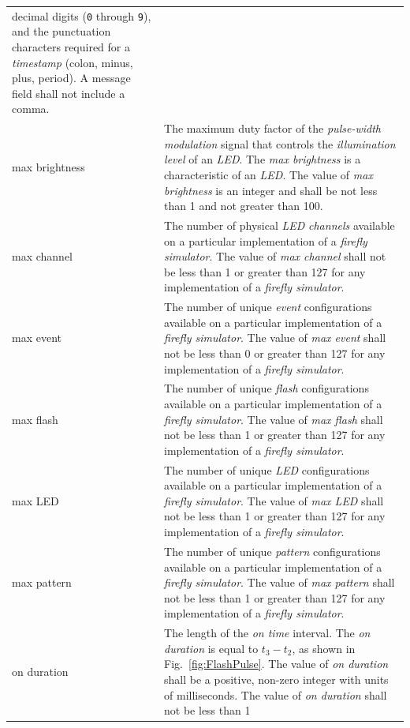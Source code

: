 \documentclass[letterpaper,11pt]{article}
\begin{document}
\begin{supertabular}{p{1.25in}p{5.25in}}
    decimal digits (\texttt{0} through \texttt{9}), and the punctuation
    characters required for a \textit{timestamp} (colon, minus, plus, period).
    A message field shall not include a comma.\\
max brightness & 
    The maximum duty factor of the \textit{pulse-width modulation} signal that
    controls the \textit{illumination level} of an \textit{LED}. The
    \textit{max brightness} is a characteristic of an \textit{LED}. The
    value of \textit{max brightness} is an integer and shall be not less
    than 1 and not greater than 100.\\
max channel & 
    The number of physical \textit{LED} \textit{channels} available on a
    particular implementation of a \textit{firefly simulator}.
    The value of \textit{max channel} shall not be less than 1 or greater
    than 127 for any implementation of a \textit{firefly simulator}.\\
max event &
    The number of unique \textit{event} configurations available on a
    particular implementation of a \textit{firefly simulator}.
    The value of \textit{max event} shall not be less than 0 or greater
    than 127 for any implementation of a \textit{firefly simulator}.\\
max flash & 
    The number of unique \textit{flash} configurations available on a
    particular implementation of a \textit{firefly simulator}.
    The value of \textit{max flash} shall not be less than 1 or greater
    than 127 for any implementation of a \textit{firefly simulator}.\\
max LED & 
    The number of unique \textit{LED} configurations available on a
    particular implementation of a \textit{firefly simulator}.
    The value of \textit{max LED} shall not be less than 1 or greater
    than 127 for any implementation of a \textit{firefly simulator}.\\
max pattern & 
    The number of unique \textit{pattern} configurations available on a
    particular implementation of a \textit{firefly simulator}.
    The value of \textit{max pattern} shall not be less than 1 or greater
    than 127 for any implementation of a \textit{firefly simulator}.\\
on duration &
    The length of the \textit{on time} interval. The \textit{on duration} is
    equal to $t_3 - t_2$, as shown in Fig.\ \ref{fig:FlashPulse}. The value
    of \textit{on duration} shall be a positive, non-zero integer with units
    of milliseconds. The value of \textit{on duration} shall not be less than 1

\end{supertabular}
\end{document}
